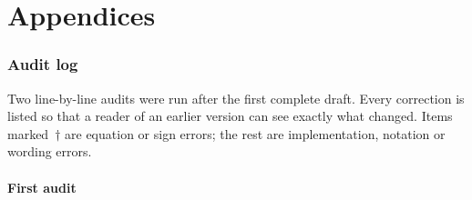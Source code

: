 \documentclass[11pt,letterpaper]{article}
\begin{document}
\part*{Appendices}

\section{Audit log}
\label{app:audit}
Two line-by-line audits were run after the first complete draft. Every correction is listed so that a reader of an earlier version can see exactly what changed. Items marked~$\dagger$ are equation or sign errors; the rest are implementation, notation or wording errors.

\subsection{First audit}
\end{document}
